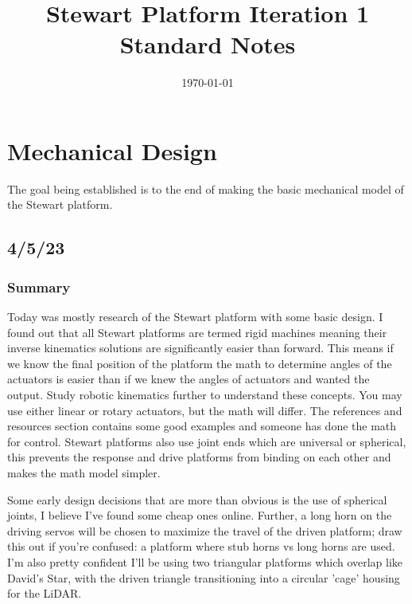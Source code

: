 \documentclass[a4paper, 10pt]{article}
\title{Stewart Platform Iteration 1 Standard Notes}
\date{\today}
\begin{document}
\maketitle

\pagebreak

\tableofcontents

\pagebreak


\section{Mechanical Design}
The goal being established is to the end of making the basic mechanical model of the Stewart platform. 

	\subsection{4/5/23}
		\subsubsection{Summary}
		Today was mostly research of the Stewart platform with some basic design. I found out that all Stewart platforms are termed rigid machines meaning their inverse kinematics solutions are significantly easier than forward. This means if we know the final position of the platform the math to determine angles of the actuators is easier than if we knew the angles of actuators and wanted the output. Study robotic kinematics further to understand these concepts. You may use either linear or rotary actuators, but the math will differ. The references and resources section contains some good examples and someone has done the math for control. Stewart platforms also use joint ends which are universal or spherical, this prevents the response and drive platforms from binding on each other and makes the math model simpler. 
		
		Some early design decisions that are more than obvious is the use of spherical joints, I believe I've found some cheap ones online. Further, a long horn on the driving servos will be chosen to maximize the travel of the driven platform; draw this out if you're confused: a platform where stub horns vs long horns are used. I'm also pretty confident I'll be using two triangular platforms which overlap like David's Star, with the driven triangle transitioning into a circular 'cage' housing for the LiDAR.
		
\end{document}
